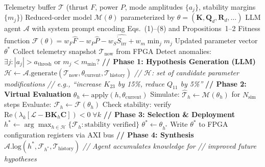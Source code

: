 \documentclass[12pt,twocolumn]{article}
\newcommand{\kk}{\mathbf{K}}
\newcommand{\Lop}{\mathcal{L}}
\newcommand{\Sdot}{\dot{S}_{\mathrm{irr}}}
\begin{document}
\begin{algorithm}[h]
\caption{Auto-Research Adaptive Gain Update}
\label{alg:autoresearch_gain}
\begin{algorithmic}[1]
\Require Telemetry buffer $\mathcal{T}$ (thrust $F$, power $P$,
  mode amplitudes $\{a_j\}$, stability margins $\{m_j\}$)
\Require Reduced-order model $\mathcal{M}(\theta)$ parameterized
  by $\theta = (\kk, \mathbf{Q}_d, \mathbf{R}_d, \ldots)$
\Require LLM agent $\mathcal{A}$ with system prompt encoding
  Eqs.~(1)--(8) and Propositions~1--2
\Require Fitness function
  $\mathcal{F}(\theta) = w_F \hat{F} - w_P \hat{P}
    - w_S \widehat{\Sdot} + w_m \min_j m_j$
\Ensure Updated parameter vector $\theta^*$
\Statex
\Loop {}
  \State Collect telemetry snapshot $\mathcal{T}_{\mathrm{now}}$
    from FPGA
  \State Detect anomalies: $\exists j: |a_j| > a_{\mathrm{thresh}}$
    or $m_j < m_{\mathrm{min}}$?
    \State \textbf{// Phase 1: Hypothesis Generation (LLM)}
    \State $\mathcal{H} \gets \mathcal{A}.\mathrm{generate}(
      \mathcal{T}_{\mathrm{now}}, \theta_{\mathrm{current}},
      \mathcal{T}_{\mathrm{history}})$
    \Statex \quad\quad\textit{// $\mathcal{H}$: set of candidate
      parameter modifications}
    \Statex \quad\quad\textit{// e.g., ``increase $K_{23}$ by 15\%,
      reduce $Q_{11}$ by 5\%''}
    \State \textbf{// Phase 2: Virtual Evaluation}
      \State $\theta_h \gets \mathrm{apply}(h, \theta_{\mathrm{current}})$
      \State Simulate: $\hat{\mathcal{T}}_h \gets \mathcal{M}(\theta_h)$
        for $N_{\mathrm{sim}}$ steps
      \State Evaluate: $\mathcal{F}_h \gets \mathcal{F}(\theta_h)$
      \State Check stability: verify
        $\mathrm{Re}(\lambda_k[\Lop - \mathbf{B}\kk_h\mathbf{C}]) < 0
        \;\forall k$
    \EndFor
    \State \textbf{// Phase 3: Selection \& Deployment}
    \State $h^* \gets \arg\max_{h \in \mathcal{H}}
      \{\mathcal{F}_h : \text{stability verified}\}$
    \State $\theta^* \gets \theta_{h^*}$
    \State Write $\theta^*$ to FPGA configuration registers
      via AXI bus
    \State \textbf{// Phase 4: Synthesis}
    \State $\mathcal{A}.\mathrm{log}(h^*, \mathcal{F}_{h^*},
      \mathcal{T}_{\mathrm{history}})$
    \Statex \quad\quad\textit{// Agent accumulates knowledge for}
    \Statex \quad\quad\textit{// improved future hypotheses}
  \EndIf
\EndLoop
\end{algorithmic}
\end{algorithm}
\end{document}
